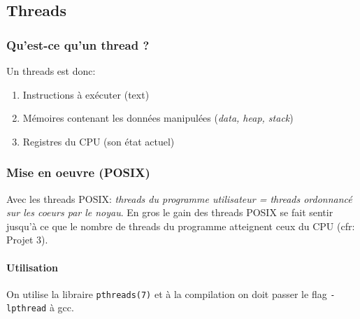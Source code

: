 \subsection{Threads}\label{threads}

\subsubsection{Qu'est-ce qu'un thread ?}\label{quest-ce-quun-thread}

Un threads est donc:

\begin{enumerate}
\def\labelenumi{\arabic{enumi}.}
\tightlist
\item
  Instructions à exécuter (text)
\item
  Mémoires contenant les données manipulées (\emph{data, heap, stack})
\item
  Registres du CPU (son état actuel)
\end{enumerate}

\subsubsection{Mise en oeuvre (POSIX)}\label{mise-en-oeuvre-posix}

Avec les threads POSIX: \emph{threads du programme utilisateur = threads
ordonnancé sur les coeurs par le noyau}. En gros le gain des threads
POSIX se fait sentir jusqu'à ce que le nombre de threads du programme
atteignent ceux du CPU (cfr: Projet 3).

\paragraph{Utilisation}\label{utilisation}

On utilise la libraire \texttt{pthreads(7)} et à la compilation on doit
passer le flag \texttt{-lpthread} à gcc.

\begin{Shaded}
\begin{Highlighting}[]

\OperatorTok{(}\OperatorTok{*}\OperatorTok{,}
                   \OperatorTok{*}\OperatorTok{,}
                    \OperatorTok{*(*}\OperatorTok{)(} \OperatorTok{*),}
                    \OperatorTok{*}\OperatorTok{);}
\end{Highlighting}
\end{Shaded}

